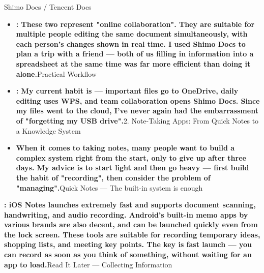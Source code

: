 


Shimo Docs / Tencent Docs

\begin{itemize}
  \item \textbf{: These two represent "online collaboration". They are suitable for multiple people editing the same document simultaneously, with each person's changes shown in real time. I used Shimo Docs to plan a trip with a friend — both of us filling in information into a spreadsheet at the same time was far more efficient than doing it alone.}Practical Workflow
  \item \textbf{: My current habit is — important files go to OneDrive, daily editing uses WPS, and team collaboration opens Shimo Docs. Since my files went to the cloud, I've never again had the embarrassment of "forgetting my USB drive".}2. Note-Taking Apps: From Quick Notes to a Knowledge System
  \item \textbf{When it comes to taking notes, many people want to build a complex system right from the start, only to give up after three days. My advice is to start light and then go heavy — first build the habit of "recording", then consider the problem of "managing".}Quick Notes — The built-in system is enough
\end{itemize}

\textbf{: iOS Notes launches extremely fast and supports document scanning, handwriting, and audio recording. Android's built-in memo apps by various brands are also decent, and can be launched quickly even from the lock screen. These tools are suitable for recording temporary ideas, shopping lists, and meeting key points. The key is fast launch — you can record as soon as you think of something, without waiting for an app to load.}Read It Later — Collecting Information


